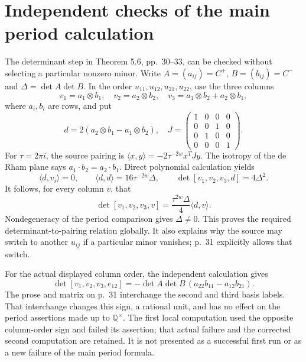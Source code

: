 \documentclass[10pt]{article}
\begin{document}
\section*{Independent checks of the main period calculation}
The determinant step in Theorem 5.6, pp. 30–33, can be checked without selecting a particular nonzero minor. Write \(A=(a_{ij})=C^+\), \(B=(b_{ij})=C^-\) and \(\Delta=\det A\det B\). In the order \(u_{11},u_{12},u_{21},u_{22}\), use the three columns \[v_1=a_1\otimes b_1,\quad v_2=a_2\otimes b_2,\quad
 v_3=a_1\otimes b_2+a_2\otimes b_1,\] where \(a_i,b_i\) are rows, and put \[d=2(a_2\otimes b_1-a_1\otimes b_2),\quad
 J=\begin{pmatrix}1&0&0&0\\0&0&1&0\\0&1&0&0\\0&0&0&1\end{pmatrix}.\] For \(\tau=2\pi i\), the source pairing is \(\langle x,y\rangle=-2\tau^{-2w}x^TJy\). The isotropy of the de Rham plane says \(a_1\cdot b_2=a_2\cdot b_1\). Direct polynomial calculation yields \[\langle d,v_i\rangle=0,\qquad
 \langle d,d\rangle=16\tau^{-2w}\Delta,\qquad
 \det[v_1,v_2,v_3,d]=4\Delta^2.\] It follows, for every column \(v\), that \[\det[v_1,v_2,v_3,v]
       =\frac{\tau^{2w}\Delta}{4}\langle d,v\rangle.\] Nondegeneracy of the period comparison gives \(\Delta\ne0\). This proves the required determinant-to-pairing relation globally. It also explains why the source may switch to another \(u_{ij}\) if a particular minor vanishes; p. 31 explicitly allows that switch.\par
For the actual displayed column order, the independent calculation gives \[\det[v_1,v_2,v_3,e_{12}]
 =-\det A\det B\,(a_{22}b_{11}-a_{12}b_{21}).\] The prose and matrix on p. 31 interchange the second and third basis labels. That interchange changes this sign, a rational unit, and has no effect on the period assertions made up to \(\mathbb Q^\times\). The first local computation used the opposite column-order sign and failed its assertion; that actual failure and the corrected second computation are retained. It is not presented as a successful first run or as a new failure of the main period formula.\par
\end{document}

